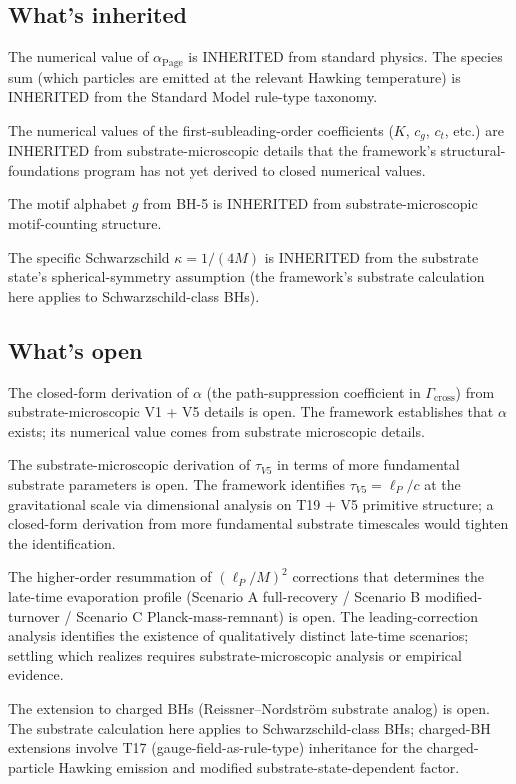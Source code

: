 \documentclass[11pt,a4paper]{article}
\begin{document}
\subsection{What's inherited}

The numerical value of $\alpha_{\mathrm{Page}}$ is INHERITED from standard physics. The species sum (which particles are emitted at the relevant Hawking temperature) is INHERITED from the Standard Model rule-type taxonomy.

The numerical values of the first-subleading-order coefficients ($K$, $c_g$, $c_t$, etc.) are INHERITED from substrate-microscopic details that the framework's structural-foundations program has not yet derived to closed numerical values.

The motif alphabet $g$ from BH-5 is INHERITED from substrate-microscopic motif-counting structure.

The specific Schwarzschild $\kappa = 1/(4M)$ is INHERITED from the substrate state's spherical-symmetry assumption (the framework's substrate calculation here applies to Schwarzschild-class BHs).

\subsection{What's open}

The closed-form derivation of $\alpha$ (the path-suppression coefficient in $\Gamma_{\mathrm{cross}}$) from substrate-microscopic V1 + V5 details is open. The framework establishes that $\alpha$ exists; its numerical value comes from substrate microscopic details.

The substrate-microscopic derivation of $\tau_{V5}$ in terms of more fundamental substrate parameters is open. The framework identifies $\tau_{V5} = \ell_P/c$ at the gravitational scale via dimensional analysis on T19 + V5 primitive structure; a closed-form derivation from more fundamental substrate timescales would tighten the identification.

The higher-order resummation of $(\ell_P/M)^2$ corrections that determines the late-time evaporation profile (Scenario A full-recovery / Scenario B modified-turnover / Scenario C Planck-mass-remnant) is open. The leading-correction analysis identifies the existence of qualitatively distinct late-time scenarios; settling which realizes requires substrate-microscopic analysis or empirical evidence.

The extension to charged BHs (Reissner--Nordstr\"om substrate analog) is open. The substrate calculation here applies to Schwarzschild-class BHs; charged-BH extensions involve T17 (gauge-field-as-rule-type) inheritance for the charged-particle Hawking emission and modified substrate-state-dependent factor.
\end{document}
